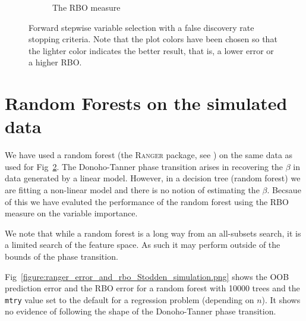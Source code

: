 \documentclass[11pt]{article}
\newcommand{\cursedforest}{\textsc{CursedForest}\xspace}
\newcommand{\ranger}{\textsc{Ranger}\xspace}
\newcommand{\mtry}{\texttt{mtry}\xspace}
\begin{document}
\begin{figure}[tbhp]
\begin{subfigure}[t]{0.5\linewidth}
    \caption{The RBO measure}
    \label{figure:rbo_Stodden_FDR.png}
  \end{subfigure} 
  \caption{Forward stepwise variable selection with a false discovery
    rate stopping criteria. Note that the plot colors have been chosen so that the lighter color indicates
      the better result, that is, a lower error or a higher RBO.}
  \label{figure:error_and_rbo_Stodden_FDR.png}
\end{figure}


\section{Random Forests on the simulated data}

We have used a random forest (the \ranger package, see \cite{Wright.and.Ziegle.2016})
on the same data as used for Fig~\ref{figure:error_and_rbo_Stodden_FDR.png}. The
Donoho-Tanner phase transition arises in recovering the $\beta$ in data generated by a linear model. However, in a
decision tree (random forest) we are fitting a non-linear model and there is no notion of estimating the
$\beta$. Becsaue of this we have evaluted the performance of the random forest using the RBO measure
on the variable importance.

We note that while a random forest is a long way from an all-subsets search, it is a limited search of the feature
space. As such it may perform outside of the bounds of the phase transition. 

Fig~\ref{figure:ranger_error_and_rbo_Stodden_simulation.png} shows the OOB prediction error and the RBO error for a
random forest with 10000 trees and the \mtry value set to the default for a regression problem (depending on $n$). It
shows no evidence of following the shape of the Donoho-Tanner phase transition.
\end{document}
